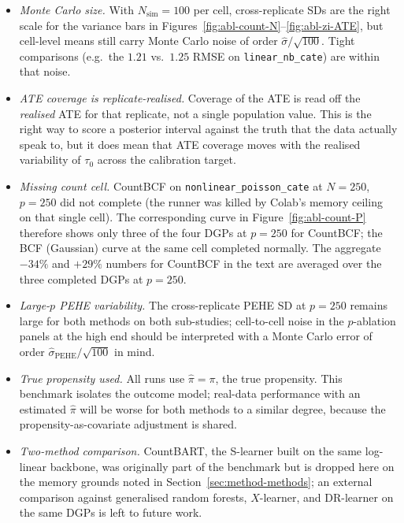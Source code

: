 \documentclass[11pt]{article}
\theoremstyle{plain}
\theoremstyle{definition}
\theoremstyle{remark}
\begin{document}
\begin{itemize}
\item \emph{Monte Carlo size.} With $N_{\mathrm{sim}} = 100$ per
  cell, cross-replicate SDs are the right scale for the variance
  bars in Figures~\ref{fig:abl-count-N}--\ref{fig:abl-zi-ATE}, but
  cell-level means still carry Monte Carlo noise of order
  $\widehat\sigma / \sqrt{100}$. Tight comparisons (e.g.\ the
  $1.21$ vs.\ $1.25$ RMSE on \verb|linear_nb_cate|) are within
  that noise.
\item \emph{ATE coverage is replicate-realised.} Coverage of the
  ATE is read off the \emph{realised} ATE for that replicate, not
  a single population value. This is the right way to score a
  posterior interval against the truth that the data actually
  speak to, but it does mean that ATE coverage moves with the
  realised variability of $\tau_0$ across the calibration target.
\item \emph{Missing count cell.} CountBCF on
  \verb|nonlinear_poisson_cate| at $N = 250$, $p = 250$ did not
  complete (the runner was killed by Colab's memory ceiling on
  that single cell). The corresponding curve in
  Figure~\ref{fig:abl-count-P} therefore shows only three of the
  four DGPs at $p = 250$ for CountBCF; the BCF (Gaussian) curve
  at the same cell completed normally. The aggregate $-34\%$ and
  $+29\%$ numbers for CountBCF in the text are averaged over the
  three completed DGPs at $p = 250$.
\item \emph{Large-$p$ PEHE variability.} The cross-replicate PEHE
  SD at $p = 250$ remains large for both methods on both
  sub-studies; cell-to-cell noise in the $p$-ablation panels at
  the high end should be interpreted with a Monte Carlo error of
  order $\widehat\sigma_{\mathrm{PEHE}} / \sqrt{100}$ in mind.
\item \emph{True propensity used.} All runs use
  $\widehat{\pi} = \pi$, the true propensity. This benchmark
  isolates the outcome model; real-data performance with an
  estimated $\widehat{\pi}$ will be worse for both methods to a
  similar degree, because the propensity-as-covariate adjustment
  is shared.
\item \emph{Two-method comparison.} CountBART, the S-learner
  built on the same log-linear backbone, was originally part of
  the benchmark but is dropped here on the memory grounds noted
  in Section~\ref{sec:method-methods}; an external comparison
  against generalised random forests, $X$-learner, and DR-learner
  on the same DGPs is left to future work.
\end{itemize}
\end{document}
